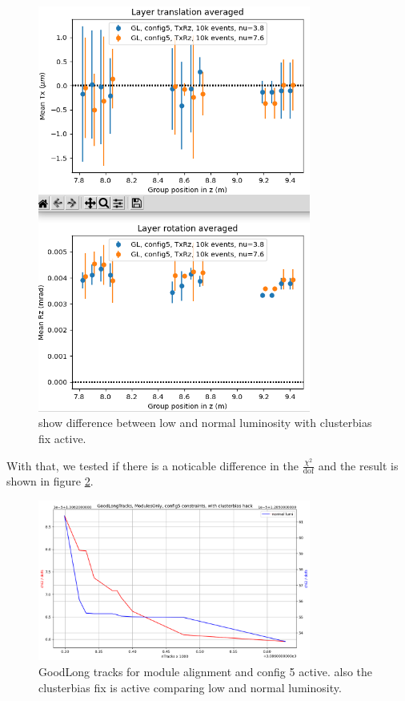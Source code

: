 \begin{figure}
  \centering
  \includegraphics[width=0.8\textwidth]{plots/jan_24_2022/low_normal_with_hack.png}
  \caption{show difference between low and normal luminosity with clusterbias fix active.}
  \label{fig:lumi_low_normal_hack_on}
\end{figure}

With that, we tested if there is a noticable difference in the $\frac{\chi^2}{\text{dof}}$ and the result is shown in figure \ref{fig:GL_lumi_low_normal_hack_on}.

\begin{figure}
  \centering
  \includegraphics[width=0.8\textwidth]{plots/feb_2_2022/GL_modules_c5_cb_hackactive_low_normal_lumi.png}
  \caption{GoodLong tracks for module alignment and config 5 active. also the clusterbias fix is active comparing low and normal luminosity.}
  \label{fig:GL_lumi_low_normal_hack_on}
\end{figure}

